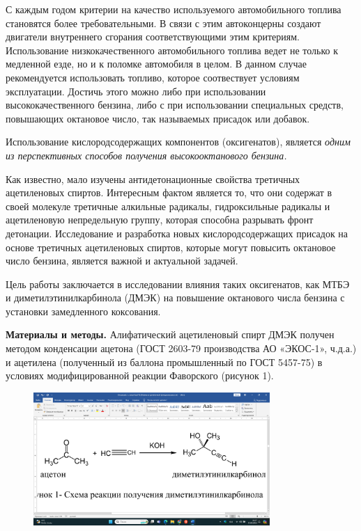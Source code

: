 С каждым годом критерии на качество используемого автомобильного топлива
становятся более требовательными. В связи с этим автоконцерны создают
двигатели внутреннего сгорания соответствующими этим критериям.
Использование низкокачественного автомобильного топлива ведет не только
к медленной езде, но и к поломке автомобиля в целом. В данном случае
рекомендуется использовать топливо, которое соотвествует условиям
эксплуатации. Достичь этого можно либо при использовании
высококачественного бензина, либо с при использовании специальных
средств, повышающих октановое число, так называемых присадок или
добавок.

Использование кислородсодержащих компонентов (оксигенатов), является
\emph{одним из перспективных способов получения высокооктанового
бензина.}

Как известно, мало изучены антидетонационные свойства третичных
ацетиленовых спиртов. Интересным фактом является то, что они содержат в
своей молекуле третичные алкильные радикалы, гидроксильные радикалы и
ацетиленовую непредельную группу, которая способна разрывать фронт
детонации. Исследование и разработка новых кислородсодержащих присадок
на основе третичных ацетиленовых спиртов, которые могут повысить
октановое число бензина, является важной и актуальной задачей.

Цель работы заключается в исследовании влияния таких оксигенатов, как
МТБЭ и диметилэтинилкарбинола (ДМЭК) на повышение октанового числа
бензина с установки замедленного коксования.

{\bfseries Материалы и методы.} Алифатический ацетиленовый спирт ДМЭК
получен методом конденсации ацетона (ГОСТ 2603-79 производства АО
«ЭКОС-1», ч.д.а.) и ацетилена (полученный из баллона промышленный по
ГОСТ 5457-75) в условиях модифицированной реакции Фаворского (рисунок
1).

\begin{figure}[H]
	\centering
	\includegraphics[width=0.8\textwidth]{media/chem/image13}
	\caption*{}
\end{figure}


